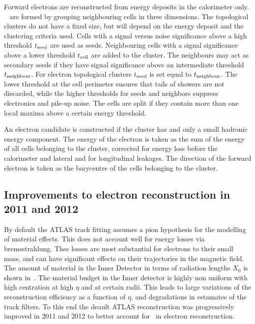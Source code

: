 Forward electrons are reconstructed from energy deposits in the calorimeter
only. ~\cite{Lampl:1099735} are formed by grouping neighbouring cells in three
dimensions. The topological clusters do not have a fixed size, but will depend
on the energy deposit and the clustering criteria used. Cells with a
signal versus noise significance above a high threshold $t_{\rm{seed}}$ are used as seeds.
Neighbouring cells with a signal significance above a lower threshold
$t_{\rm{cell}}$ are added to the cluster. The neighbours may act as
secondary seeds if they have signal significance above an intermediate threshold
$t_{\rm{neighbour}}$. For electron topological clusters $t_{\rm{seed}}$ is set
equal to $t_{\rm{neighbour}}$. The lower threshold at the cell perimeter ensures that
tails of showers are not discarded, while the higher thresholds for seeds and
neighbors suppress electronics and pile-up noise. The cells are split if they
contain more than one local maxima above a certain energy threshold. 

An electron candidate is constructed if the cluster has  and only a
small hadronic energy component. The energy
of the electron is taken as the sum of the energy of all cells belonging to the cluster,
corrected for energy loss before the calorimeter and lateral and for longitudinal
leakages. The direction of the forward electron is taken as the barycentre of the cells
belonging to the cluster.

\subsection{Improvements to electron reconstruction in 2011 and 2012}

By default the ATLAS track fitting assumes a pion hypothesis for the modelling
of material effects. This does not account well for energy losses via
bremsstrahlung. Thes losses are most substantial for electrons to their small
mass, and can have significant effects on their trajectories in the magnetic
field. The amount of material in the Inner Detector in terms of radiation lengths
$X_{0}$ is shown in~. The material budget in the Inner detector
is highly non uniform with high centration at high $\eta$ and at certain radii.
This leads to large variations of the reconstruction efficiency as a function of
$\eta$, and degradations in estamates of the track filters. To this end the
deault ATLAS reconstruction was progressively improved in 2011 and 2012 to
better account for \brem\ in electron reconstruction.

